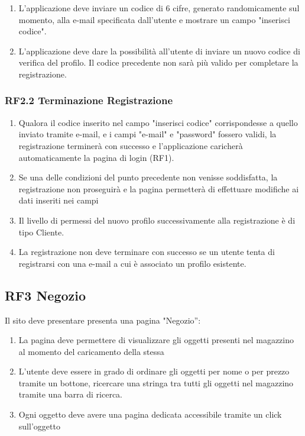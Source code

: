 \documentclass{report}
\begin{document}
\begin{enumerate}
	\item L'applicazione deve inviare un codice di 6 cifre, generato randomicamente sul momento, alla e-mail specificata dall’utente e mostrare un campo "inserisci codice".
		
	\item L'applicazione deve dare la possibilità all’utente di inviare un nuovo codice di verifica del profilo. Il codice precedente non sarà più valido per completare la registrazione.
		
\end{enumerate}


\subsubsection*{RF2.2 Terminazione Registrazione}
\begin{enumerate}
	\item Qualora il codice inserito nel campo "inserisci codice" corrispondesse a quello inviato tramite e-mail, e i campi "e-mail" e "password" fossero validi, la registrazione terminerà con successo e l'applicazione caricherà automaticamente la pagina di login (RF1).
	\item Se una delle condizioni del punto precedente non venisse soddisfatta, la registrazione non proseguirà e la pagina permetterà di effettuare modifiche ai dati inseriti nei campi
	\item Il livello di permessi del nuovo profilo successivamente alla registrazione è di tipo Cliente.
	\item La registrazione non deve terminare con successo se un utente tenta di registrarsi con una e-mail a cui è associato un profilo esistente.

\end{enumerate}


\subsection*{RF3 Negozio}
Il sito deve presentare presenta una pagina "Negozio”: 

\begin{enumerate}
	\item La pagina deve permettere di visualizzare gli oggetti presenti nel magazzino al momento del caricamento della stessa
	
	\item L’utente deve essere in grado di ordinare gli oggetti per nome o per prezzo tramite un bottone, ricercare una stringa tra tutti gli oggetti nel magazzino tramite una barra di ricerca.
	
	\item Ogni oggetto deve avere una pagina dedicata accessibile tramite un click sull’oggetto
\end{enumerate}
\end{document}
